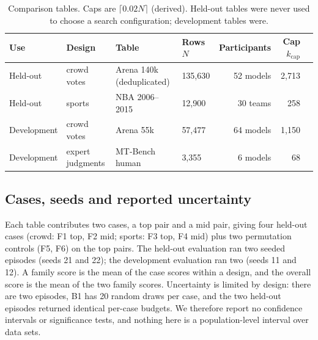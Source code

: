 \documentclass{article}
\newcommand{\kcap}{k_{\mathrm{cap}}}
\begin{document}
\begin{table}[t]
\centering
\caption{Comparison tables. Caps are $\lceil 0.02N\rceil$ (derived). Held-out tables were never used to choose a search configuration; development tables were.}
\label{tab:data}
\small
\begin{tabular}{llllrrr}
\toprule
Use & Design & Table & Rows $N$ & Participants & Cap $\kcap$\\
\midrule
Held-out & crowd votes & Arena 140k (deduplicated) & 135,630 & 52 models & 2,713\\
Held-out & sports & NBA 2006--2015 & 12,900 & 30 teams & 258\\
Development & crowd votes & Arena 55k & 57,477 & 64 models & 1,150\\
Development & expert judgments & MT-Bench human & 3,355 & 6 models & 68\\
\bottomrule
\end{tabular}
\end{table}

\subsection{Cases, seeds and reported uncertainty}
Each table contributes two cases, a top pair and a mid pair, giving four held-out cases (crowd: F1 top, F2 mid; sports: F3 top, F4 mid) plus two permutation controls (F5, F6) on the top pairs. The held-out evaluation ran two seeded episodes (seeds 21 and 22); the development evaluation ran two (seeds 11 and 12). A family score is the mean of the case scores within a design, and the overall score is the mean of the two family scores. Uncertainty is limited by design: there are two episodes, B1 has 20 random draws per case, and the two held-out episodes returned identical per-case budgets. We therefore report no confidence intervals or significance tests, and nothing here is a population-level interval over data sets.
\end{document}
